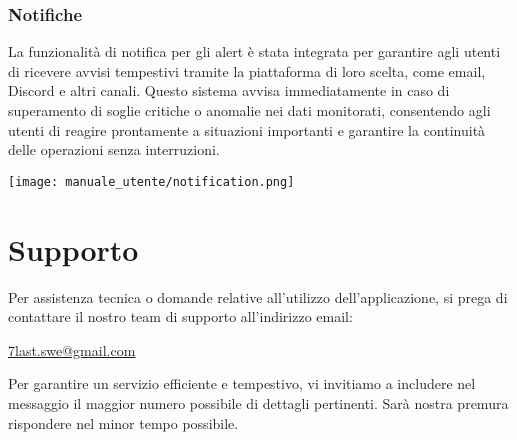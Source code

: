\subsubsection{Notifiche}
La funzionalità di notifica per gli alert è stata integrata per garantire agli utenti di ricevere avvisi tempestivi tramite la piattaforma di loro scelta, come email, Discord e altri canali. Questo sistema avvisa immediatamente in caso di superamento di soglie critiche o anomalie nei dati monitorati, consentendo agli utenti di reagire prontamente a situazioni importanti e garantire la continuità delle operazioni senza interruzioni.
\begin{center}
    \texttt{[image: manuale\_utente/notification.png]}
\end{center} 

\newpage
\section{Supporto}
Per assistenza tecnica o domande relative all’utilizzo dell’applicazione, si prega di contattare il nostro team di supporto all'indirizzo email: 
\begin{center}
    \href{mailto:7last.swe@gmail.com}{7last.swe@gmail.com}
\end{center} 
Per garantire un servizio efficiente e tempestivo, vi invitiamo a includere nel messaggio il maggior numero possibile di dettagli pertinenti. Sarà nostra premura rispondere nel minor tempo possibile.